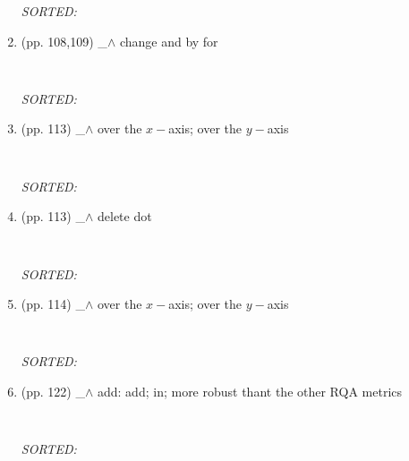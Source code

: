 \documentclass[12pt]{article}
\begin{document}
\begin{enumerate}
\begin{verbatim}
	\end{verbatim}
	\textit{
	SORTED:  
	}
	\\



\item  (pp. 108,109)  \_$\wedge$  
	change and by for
	\begin{verbatim}
	
	\end{verbatim}
	\textit{
	SORTED:  
	}
	\\

\item  (pp. 113)  \_$\wedge$  
	over the $x-$axis; over the $y-$axis
	\begin{verbatim}
	
	\end{verbatim}
	\textit{
	SORTED:  
	}
	\\

\item  (pp. 113)  \_$\wedge$  
	delete dot
	\begin{verbatim}
	
	\end{verbatim}
	\textit{
	SORTED:  
	}
	\\


\item  (pp. 114)  \_$\wedge$  
	over the $x-$axis; over the $y-$axis
	\begin{verbatim}
	
	\end{verbatim}
	\textit{
	SORTED:  
	}
	\\


\item  (pp. 122)  \_$\wedge$  
	add: add; in;
	more robust thant the other RQA metrics
	\begin{verbatim}
	
	\end{verbatim}
	\textit{
	SORTED:  
	}
	\\





\end{enumerate}
\end{document}
